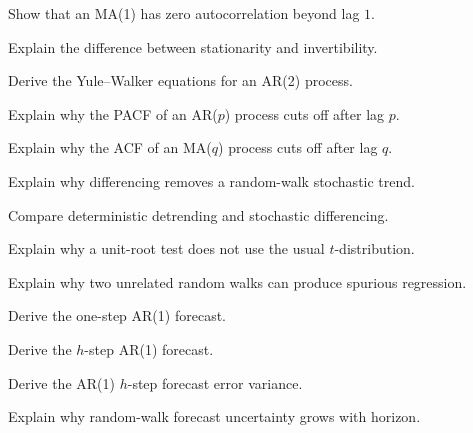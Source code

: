 \begin{exercise}[3]
Show that an MA(1) has zero autocorrelation beyond lag \(1\).
\end{exercise}

\begin{exercise}[3]
Explain the difference between stationarity and invertibility.
\end{exercise}

\begin{exercise}[3]
Derive the Yule--Walker equations for an AR(2) process.
\end{exercise}

\begin{exercise}[3]
Explain why the PACF of an AR(\(p\)) process cuts off after lag \(p\).
\end{exercise}

\begin{exercise}[3]
Explain why the ACF of an MA(\(q\)) process cuts off after lag \(q\).
\end{exercise}

\begin{exercise}[3]
Explain why differencing removes a random-walk stochastic trend.
\end{exercise}

\begin{exercise}[3]
Compare deterministic detrending and stochastic differencing.
\end{exercise}

\begin{exercise}[3]
Explain why a unit-root test does not use the usual \(t\)-distribution.
\end{exercise}

\begin{exercise}[3]
Explain why two unrelated random walks can produce spurious regression.
\end{exercise}

\begin{exercise}[3]
Derive the one-step AR(1) forecast.
\end{exercise}

\begin{exercise}[3]
Derive the \(h\)-step AR(1) forecast.
\end{exercise}

\begin{exercise}[3]
Derive the AR(1) \(h\)-step forecast error variance.
\end{exercise}

\begin{exercise}[3]
Explain why random-walk forecast uncertainty grows with horizon.
\end{exercise}

